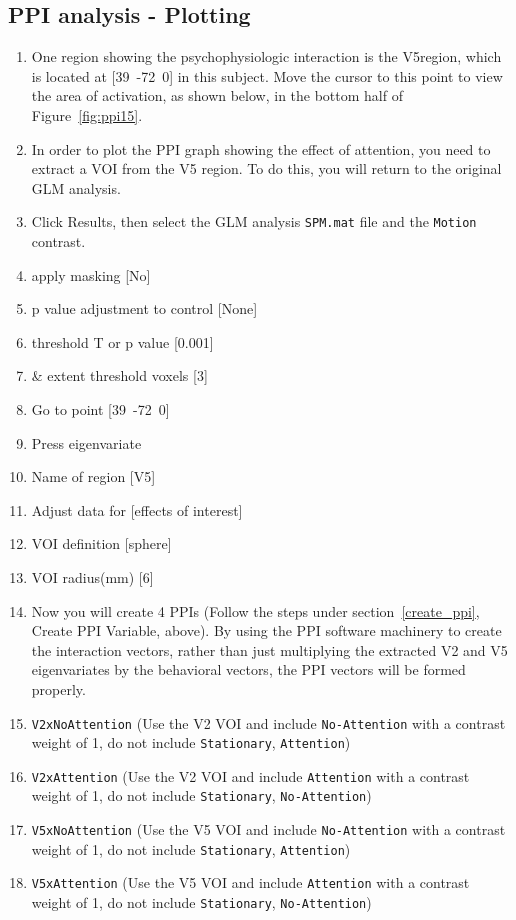 \subsection{PPI analysis - Plotting}
\begin{enumerate}
\item One region showing the psychophysiologic interaction is the V5region, which is located at [39~-72~0] in this subject. Move the cursor to this point to view the area of activation, as shown below, in the bottom half of Figure~\ref{fig:ppi15}.

\item In order to plot the PPI graph showing the effect of attention, you need to extract a VOI from the V5 region. To do this, you will return to the original GLM analysis.
\item Click Results, then select the GLM analysis \texttt{SPM.mat} file and the \texttt{Motion} contrast.
\item apply masking [No]
\item p value adjustment to control [None]
\item threshold {T or p value} [0.001]
\item \& extent threshold {voxels} [3]
\item Go to point [39~-72~0]
\item Press eigenvariate
\item Name of region [V5]
\item Adjust data for [effects of interest]
\item VOI definition [sphere]
\item VOI radius(mm) [6]
\item Now you will create 4 PPIs (Follow the steps under section~\ref{create_ppi}, Create PPI Variable, above). By using the PPI software machinery to create the interaction vectors, rather than just multiplying the extracted V2 and V5 eigenvariates by the behavioral vectors, the PPI vectors will be formed properly.

\item \texttt{V2xNoAttention} (Use the V2 VOI and include \texttt{No-Attention} with a contrast weight of 1, do not include \texttt{Stationary}, \texttt{Attention})
\item \texttt{V2xAttention} (Use the V2 VOI and include \texttt{Attention} with a contrast weight of 1, do not include \texttt{Stationary}, \texttt{No-Attention})
\item \texttt{V5xNoAttention} (Use the V5 VOI and include \texttt{No-Attention} with a contrast weight of 1, do not include \texttt{Stationary}, \texttt{Attention})
\item \texttt{V5xAttention} (Use the V5 VOI and include \texttt{Attention} with a contrast weight of 1, do not include \texttt{Stationary}, \texttt{No-Attention})


\end{enumerate}
